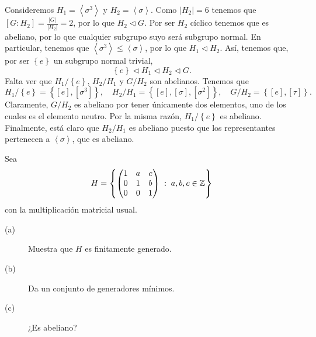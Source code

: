 \documentclass{article}
\begin{document}
\begin{sol}
	Consideremos $\displaystyle H_{1} = \left\langle \sigma^{3} \right\rangle  $ y $\displaystyle H_{2} = \left\langle \sigma  \right\rangle  $. Como $\displaystyle \left|H_{2}\right| = 6 $ tenemos que $\displaystyle \left[G:H_{2}\right]  = \frac{ \left|G\right|}{ \left|H_{2}\right|} = 2 $, por lo que $\displaystyle H_{2} \lhd G $. Por ser $\displaystyle H_{2} $ cíclico tenemos que es abeliano, por lo que cualquier subgrupo suyo será subgrupo normal. En particular, tenemos que $\displaystyle \left\langle \sigma^{3} \right\rangle \leq \left\langle \sigma  \right\rangle  $, por lo que $\displaystyle H_{1} \lhd H_{2} $. Así, tenemos que, por ser $\displaystyle \left\{ e\right\}  $ un subgrupo normal trivial,
	\[ \left\{ e\right\} \lhd H_{1} \lhd H_{2} \lhd G .\]
	Falta ver que $\displaystyle H_{1} / \left\{ e\right\}  $, $\displaystyle H_{2} / H_{1} $ y $\displaystyle G / H_{2} $ son abelianos. Tenemos que 
	\[H_{1}/ \left\{ e\right\} = \left\{ [e], [\sigma^{3}]\right\}, \quad H_{2}/H_{1} = \left\{ [e], [\sigma], [\sigma^{2}]\right\} , \quad G/H_{2} = \left\{ [e], [\tau]\right\}  .\]
	Claramente, $\displaystyle G/H_{2} $ es abeliano por tener únicamente dos elementos, uno de los cuales es el elemento neutro. Por la misma razón, $\displaystyle H_{1}/ \left\{ e\right\}  $ es abeliano. Finalmente, está claro que $\displaystyle H_{2}/H_{1} $ es abeliano puesto que los representantes pertenecen a $\displaystyle \left\langle \sigma  \right\rangle  $, que es abeliano.	
\end{sol}

\begin{ej}
Sea 
\[H = \left\{ \begin{pmatrix} 1 & a & c \\ 0 & 1 & b \\ 0 & 0 & 1 \end{pmatrix} \; : \; a,b,c \in \mathbb{Z}\right\}  \]
con la multiplicación matricial usual.
\begin{description}
\item[(a)] Muestra que $\displaystyle H $ es finitamente generado.
\item[(b)] Da un conjunto de generadores mínimos.
\item[(c)] ¿Es abeliano?
\end{description}
\end{ej}
\end{document}
